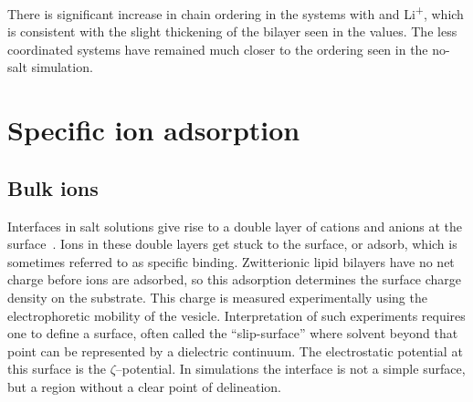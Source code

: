 There is significant increase in chain ordering in the systems 
with \na{} and Li\textsuperscript{+}, which {is} consistent with the slight thickening
of the bilayer seen in the \db{} values. The less coordinated \mg{} systems have remained much closer to the 
ordering seen in the no-salt simulation.


\section{Specific ion adsorption}
\subsection{Bulk ions}

Interfaces in salt solutions give rise to a double layer of cations and anions at the surface~\cite{israelachvili:2011:intermol}. 
Ions in these double layers get stuck to the surface, or adsorb, which is sometimes referred to as specific binding. Zwitterionic lipid bilayers have no net charge before ions are adsorbed,
so this adsorption
determines the surface charge density on the substrate. This charge is measured experimentally using the electrophoretic mobility of the vesicle. Interpretation
of such experiments requires one to define a surface, often called the ``slip-surface'' where solvent 
beyond that point
can be represented by a dielectric continuum. The electrostatic potential at this surface is the $\zeta$--potential.
In simulations the interface is not a simple surface, but a region {without a clear point of delineation}. 

